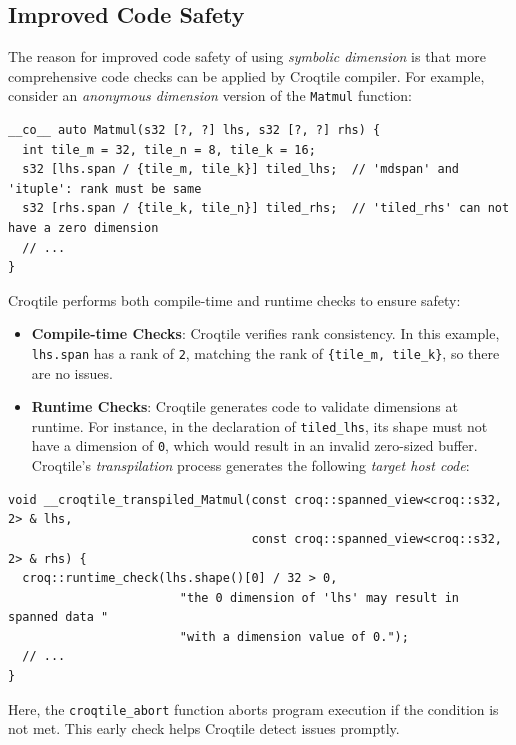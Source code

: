 \subsection*{Improved Code Safety}

The reason for improved code safety of using \emph{symbolic dimension} is that more comprehensive code checks can be applied by Croqtile compiler. For example, consider an \emph{anonymous dimension} version of the \texttt{Matmul} function:

\begin{lstlisting}[language=croqtile,caption={A kernel with anonymous dimensions}]
__co__ auto Matmul(s32 [?, ?] lhs, s32 [?, ?] rhs) {
  int tile_m = 32, tile_n = 8, tile_k = 16;
  s32 [lhs.span / {tile_m, tile_k}] tiled_lhs;  // 'mdspan' and 'ituple': rank must be same
  s32 [rhs.span / {tile_k, tile_n}] tiled_rhs;  // 'tiled_rhs' can not have a zero dimension
  // ...
}
\end{lstlisting}

Croqtile performs both compile-time and runtime checks to ensure safety:

\begin{itemize}[leftmargin=1.6em]
\item \textbf{Compile-time Checks}: Croqtile verifies rank consistency. In this example, \texttt{lhs.span} has a rank of \texttt{2}, matching the rank of \texttt{\{tile\_\allowbreak{}m, tile\_\allowbreak{}k\}}, so there are no issues.
\item \textbf{Runtime Checks}: Croqtile generates code to validate dimensions at runtime. For instance, in the declaration of \texttt{tiled\_lhs}, its shape must not have a dimension of \texttt{0}, which would result in an invalid zero-sized buffer. Croqtile's \emph{transpilation} process generates the following \emph{target host code}:
\end{itemize}

\begin{lstlisting}[language={},caption={The transpiled signature}]
void __croqtile_transpiled_Matmul(const croq::spanned_view<croq::s32, 2> & lhs,
                                  const croq::spanned_view<croq::s32, 2> & rhs) {
  croq::runtime_check(lhs.shape()[0] / 32 > 0,
                        "the 0 dimension of 'lhs' may result in spanned data "
                        "with a dimension value of 0.");
  // ...
}
\end{lstlisting}

Here, the \texttt{croqtile\_\allowbreak{}abort} function aborts program execution if the condition is not met. This early check helps Croqtile detect issues promptly.

